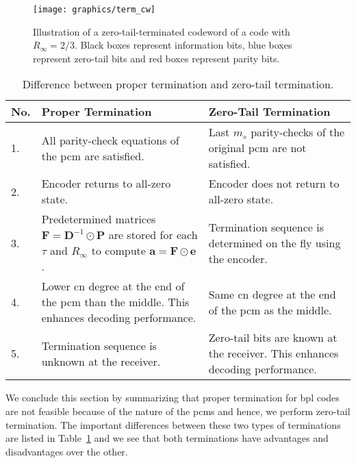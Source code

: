 \begin{figure}[htbp]
  \centering
  \texttt{[image: graphics/term\_cw]}
  \caption{Illustration of a zero-tail-terminated codeword of a code with $R_\infty=2/3$. Black boxes represent information bits, blue boxes represent zero-tail bits and red boxes represent parity bits.}
  \label{fig:term_cw}
\end{figure}

\begin{table}[htbp]
  \centering
  \begin{tabular}{|l|p{7cm}|p{7cm}|}
    \hline
    \textbf{No.} &\textbf{Proper Termination} &\textbf{Zero-Tail Termination}\\
    \hline
    \hline
    1. &All parity-check equations of the \gls{pcm} are satisfied. &Last $m_s$ parity-checks of the original \gls{pcm} are not satisfied.\\
    \hline
    2. &Encoder returns to all-zero state. &Encoder does not return to all-zero state.\\
    \hline
    3. &Predetermined matrices $\mathbf{F}=\mathbf{D}^{-1}\odot\mathbf{P}$ are stored for each $\tau$ and $R_\infty$ to compute $\mathbf{a}=\mathbf{F}\odot\mathbf{e}$. &Termination sequence is determined on the fly using the encoder.\\
    \hline
    4. &Lower \gls{cn} degree at the end of the \gls{pcm} than the middle. This enhances decoding performance. &Same \gls{cn} degree at the end of the \gls{pcm} as the middle.\\
    \hline
    5. &Termination sequence is unknown at the receiver. &Zero-tail bits are known at the receiver. This enhances decoding performance.\\
    \hline
  \end{tabular}
  \caption{Difference between proper termination and zero-tail termination.}
  \label{tab:diff_term}
\end{table}

We conclude this section by summarizing that proper termination for \gls{bpl} codes are not feasible because of the nature of the \glspl{pcm} and hence, we perform zero-tail termination. The important differences between these two types of terminations are listed in Table~\ref{tab:diff_term} and we see that both terminations have advantages and disadvantages over the other.